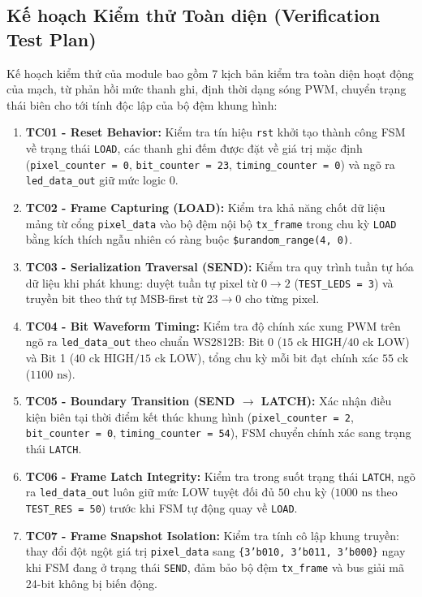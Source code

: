 \documentclass[12pt,a4paper]{article}
\begin{document}
\subsection{Kế hoạch Kiểm thử Toàn diện (Verification Test Plan)}
Kế hoạch kiểm thử của module bao gồm 7 kịch bản kiểm tra toàn diện hoạt động của mạch, từ phản hồi mức thanh ghi, định thời dạng sóng PWM, chuyển trạng thái biên cho tới tính độc lập của bộ đệm khung hình:
\begin{enumerate}
    \item \textbf{TC01 - Reset Behavior:} Kiểm tra tín hiệu \texttt{rst} khởi tạo thành công FSM về trạng thái \texttt{LOAD}, các thanh ghi đếm được đặt về giá trị mặc định (\texttt{pixel\_counter = 0}, \texttt{bit\_counter = 23}, \texttt{timing\_counter = 0}) và ngõ ra \texttt{led\_data\_out} giữ mức logic 0.
    \item \textbf{TC02 - Frame Capturing (LOAD):} Kiểm tra khả năng chốt dữ liệu mảng từ cổng \texttt{pixel\_data} vào bộ đệm nội bộ \texttt{tx\_frame} trong chu kỳ \texttt{LOAD} bằng kích thích ngẫu nhiên có ràng buộc \texttt{\$urandom\_range(4, 0)}.
    \item \textbf{TC03 - Serialization Traversal (SEND):} Kiểm tra quy trình tuần tự hóa dữ liệu khi phát khung: duyệt tuần tự pixel từ $0 \to 2$ (\texttt{TEST\_LEDS = 3}) và truyền bit theo thứ tự MSB-first từ $23 \to 0$ cho từng pixel.
    \item \textbf{TC04 - Bit Waveform Timing:} Kiểm tra độ chính xác xung PWM trên ngõ ra \texttt{led\_data\_out} theo chuẩn WS2812B: Bit 0 ($15\text{ ck HIGH} / 40\text{ ck LOW}$) và Bit 1 ($40\text{ ck HIGH} / 15\text{ ck LOW}$), tổng chu kỳ mỗi bit đạt chính xác $55\text{ ck}$ ($1100\text{ ns}$).
    \item \textbf{TC05 - Boundary Transition (SEND $\to$ LATCH):} Xác nhận điều kiện biên tại thời điểm kết thúc khung hình (\texttt{pixel\_counter = 2}, \texttt{bit\_counter = 0}, \texttt{timing\_counter = 54}), FSM chuyển chính xác sang trạng thái \texttt{LATCH}.
    \item \textbf{TC06 - Frame Latch Integrity:} Kiểm tra trong suốt trạng thái \texttt{LATCH}, ngõ ra \texttt{led\_data\_out} luôn giữ mức LOW tuyệt đối đủ $50\text{ chu kỳ}$ ($1000\text{ ns}$ theo \texttt{TEST\_RES = 50}) trước khi FSM tự động quay về \texttt{LOAD}.
    \item \textbf{TC07 - Frame Snapshot Isolation:} Kiểm tra tính cô lập khung truyền: thay đổi đột ngột giá trị \texttt{pixel\_data} sang \texttt{\{3'b010, 3'b011, 3'b000\}} ngay khi FSM đang ở trạng thái \texttt{SEND}, đảm bảo bộ đệm \texttt{tx\_frame} và bus giải mã 24-bit không bị biến động.
\end{enumerate}
\end{document}
